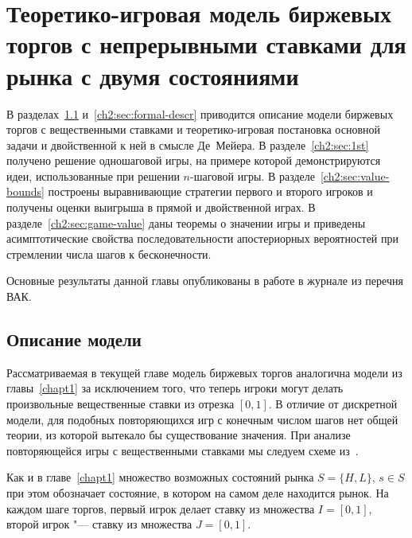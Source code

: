\chapter{Теоретико-игровая модель биржевых торгов с непрерывными ставками для
  рынка с двумя состояниями} \label{chapt2}%
{
\newcommand{\Port}[1]{y_{#1}}
\newcommand*\dualFPS{\ensuremath{(p,\ \sigma)}}
\dualg[4][1=n, 2={\dualFPS}, 3=x, 4=\tau]{\ensuremath{g^*_{#1}(#3, #2, #4)}}

В разделах~\ref{ch2:sec:model-descr} и~\ref{ch2:sec:formal-descr} приводится описание модели биржевых торгов с вещественными ставками и теоретико-игровая постановка основной задачи и двойственной к ней в смысле Де~Мейера.
В разделе~\ref{ch2:sec:1st} получено решение одношаговой игры, на примере которой демонстрируются идеи, использованные при решении $n$-шаговой игры.
В разделе~\ref{ch2:sec:value-bounds} построены выравнивающие стратегии первого и второго игроков и получены оценки выигрыша в прямой и двойственной играх.
В разделе~\ref{ch2:sec:game-value} даны теоремы о значении игры и приведены асимптотические свойства последовательности апостериорных вероятностей при стремлении числа шагов к бесконечности.

Основные результаты данной главы опубликованы в работе \cite{pyanykh16:cont} в журнале из перечня ВАК.

\section{Описание модели}
\label{ch2:sec:model-descr}

Рассматриваемая в текущей главе модель биржевых торгов аналогична модели из главы~\ref{chapt1} за исключением того, что теперь игроки могут делать произвольные вещественные ставки из отрезка $[0, 1]$.
В отличие от дискретной модели, для подобных повторяющихся игр с конечным числом шагов нет общей теории, из которой вытекало бы существование значения.
При анализе повторяющейся игры с вещественными ставками мы следуем схеме из~\cite{demeyer02c}.

Как и в главе~\ref{chapt1} множество возможных состояний рынка $S = \{H, L\}$, $s \in S$ при этом обозначает состояние, в котором на самом деле находится рынок.
На каждом шаге торгов, первый игрок делает ставку из множества $I = [0, 1]$, второй игрок "--- ставку из множества $J = [0,1]$.

}
